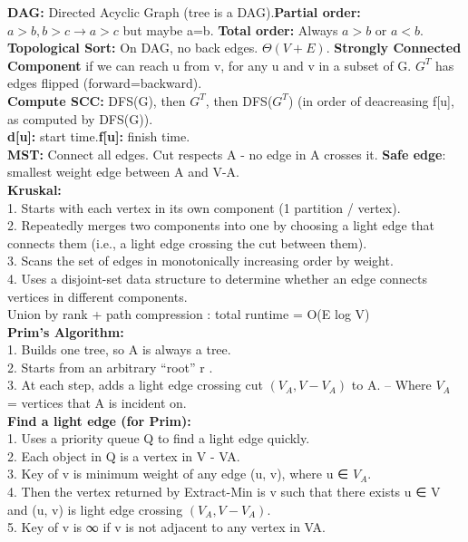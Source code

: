 \documentclass[paper=a4, fontsize=10pt]{scrartcl} %
\begin{document}
\textbf{DAG:} Directed Acyclic Graph (tree is a DAG).\textbf{Partial order:} $a>b,b>c \rightarrow a>c$ but maybe a=b. \textbf{Total order:} Always $a>b$ or $a<b$.\\
\textbf{Topological Sort:} On DAG, no back edges. $\Theta(V+E)$. \textbf{Strongly Connected Component } if we can reach u from v, for any u and v in a subset of G. $G^T$ has edges flipped (forward=backward).\\
\textbf{Compute SCC:} DFS(G), then $G^T$, then DFS($G^T$) (in order of deacreasing f[u], as computed by DFS(G)).\\
\textbf{d[u]:} start time.\textbf{f[u]:} finish time.\\
\textbf{MST: }Connect all edges. Cut respects A - no edge in A crosses it.\textbf{ Safe edge}: smallest weight edge between A and V-A.\\
\textbf{Kruskal:}\\
1. Starts	with	each	vertex	in	its	own	component (1 partition / vertex).	\\
2. Repeatedly	merges	two	components	into	one	by	choosing	a	
light	edge	that	connects	them	(i.e.,	a	light	edge	crossing	the	
cut	between	them).	\\
3. Scans	the	set	of	edges	in	monotonically	increasing	order	by	
weight.	\\
4. Uses	a	 disjoint-set	data	structure	 to	determine	whether	an	
edge	connects	vertices	in	different	components.\\
Union by rank + path compression : total runtime = O(E log V)\\
\textbf{Prim's Algorithm: }\\
1. Builds	 one	tree,	so	 A	 is	always	a	tree.	\\
2. Starts	from	an	arbitrary	 “root” r	 .	\\
3. At	each	step,	 adds	a	light	edge	 crossing	cut	 $(V_A, V	 - V_A)$ to A.
– Where	 $V_A$ = vertices	that	 A	 is	incident	on.\\
\textbf{Find a light edge (for Prim):}\\
1. Uses	a	 priority	queue	 Q	to	find	a		light	edge	quickly.\\	
2. Each	object	in	 Q	 is	a	vertex	in	V - VA.	\\
3. Key	of	 v is	minimum	weight	of	any	edge	 (u, v),	where	 u	 ∈ $V_A$.	\\
4. Then	the	vertex	returned	by	Extract-Min	is	 v such	that	there	
exists	 u	 ∈ V  and	 (u, v) is	light	edge	crossing	 $(V_A, V - V_A)$.	\\
5. Key	of	 v is	 ∞ if	 v is	not	adjacent	to	any	vertex	in	VA.\\
\end{document}
